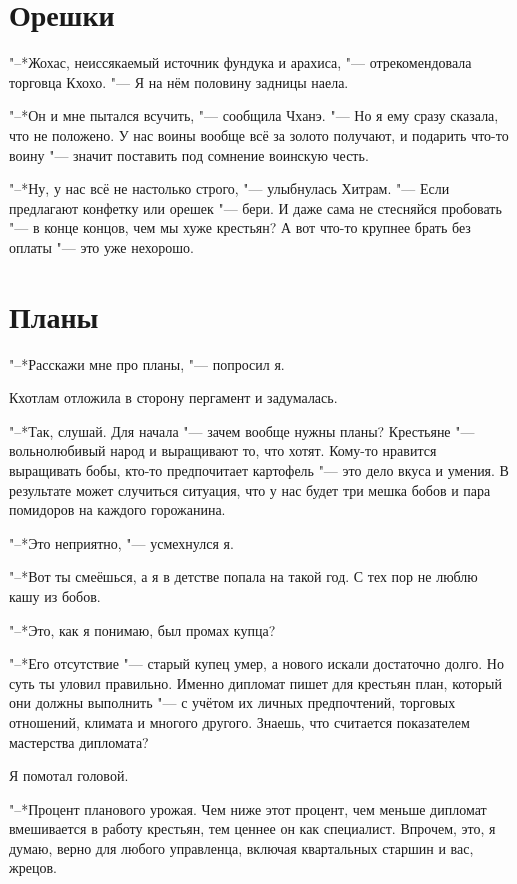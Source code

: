 \section{Орешки}

"--*Жохас, неиссякаемый источник фундука и арахиса, "--- отрекомендовала торговца Кхохо.
"--- Я на нём половину задницы наела.

"--*Он и мне пытался всучить, "--- сообщила Чханэ.
"--- Но я ему сразу сказала, что не положено.
У нас воины вообще всё за золото получают, и подарить что-то воину "--- значит поставить под сомнение воинскую честь.

"--*Ну, у нас всё не настолько строго, "--- улыбнулась Хитрам.
"--- Если предлагают конфетку или орешек "--- бери.
И даже сама не стесняйся пробовать "--- в конце концов, чем мы хуже крестьян?
А вот что-то крупнее брать без оплаты "--- это уже нехорошо.

\section{Планы}

"--*Расскажи мне про планы, "--- попросил я.

Кхотлам отложила в сторону пергамент и задумалась.

"--*Так, слушай.
Для начала "--- зачем вообще нужны планы?
Крестьяне "--- вольнолюбивый народ и выращивают то, что хотят.
Кому-то нравится выращивать бобы, кто-то предпочитает картофель "--- это дело вкуса и умения.
В результате может случиться ситуация, что у нас будет три мешка бобов и пара помидоров на каждого горожанина.

"--*Это неприятно, "--- усмехнулся я.

"--*Вот ты смеёшься, а я в детстве попала на такой год.
С тех пор не люблю кашу из бобов.

"--*Это, как я понимаю, был промах купца?

"--*Его отсутствие "--- старый купец умер, а нового искали достаточно долго.
Но суть ты уловил правильно.
Именно дипломат пишет для крестьян план, который они должны выполнить "--- с учётом их личных предпочтений, торговых отношений, климата и многого другого.
Знаешь, что считается показателем мастерства дипломата?

Я помотал головой.

"--*Процент планового урожая.
Чем ниже этот процент, чем меньше дипломат вмешивается в работу крестьян, тем ценнее он как специалист.
Впрочем, это, я думаю, верно для любого управленца, включая квартальных старшин и вас, жрецов.

